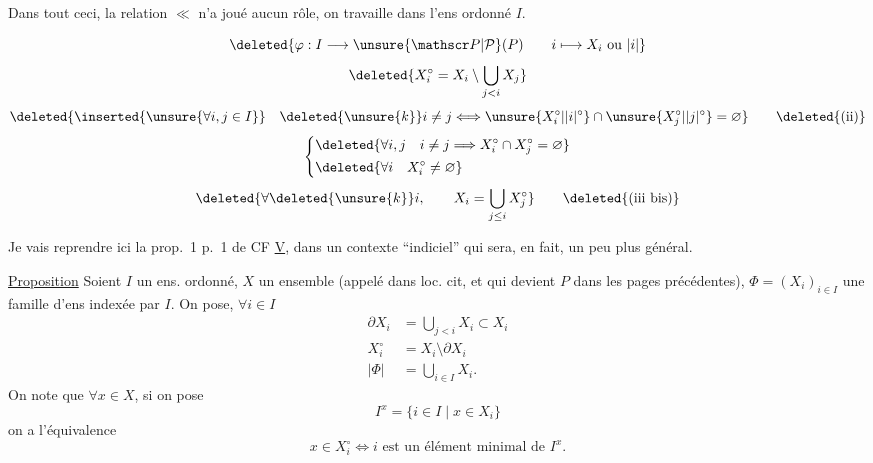 Dans tout ceci, la relation $\ll$ n'a joué aucun rôle, on travaille dans l'ens ordonné $I$.

\[
\deleted{\varphi:I\longrightarrow\unsure{\mathscr P|\mathcal P}(P)\qquad i\longmapsto X_i\text{ ou }|i|}
\]
\[
\deleted{X_i^{\circ}=X_i\setminus\bigcup_{j<i}X_j}
\]
\[
\deleted{\inserted{\unsure{\forall i,j\in I}}\quad \deleted{\unsure{k}}i\ne j\Longleftrightarrow
\unsure{X_i^{\circ}|\lvert i\rvert^{\circ}}\cap\unsure{X_j^{\circ}|\lvert j\rvert^{\circ}}=\varnothing}\tag*{\deleted{(ii)}}
\]
\[
\left\{\begin{aligned}
&\deleted{\forall i,j\quad i\ne j\Longrightarrow X_i^{\circ}\cap X_j^{\circ}=\varnothing}\\
&\deleted{\forall i\quad X_i^{\circ}\ne\varnothing}
\end{aligned}\right.
\]
\[
\deleted{\forall\deleted{\unsure{k}}i,\qquad X_i=\bigcup_{j\leq i}X_j^{\circ}}\tag*{\deleted{(iii bis)}}
\]

Je vais reprendre ici la prop.~1 p.~1 de CF \uline{V}, dans un contexte ``indiciel'' qui sera, en fait, un peu plus général.

\uline{Proposition} Soient $I$ un ens. ordonné,  $X$ un ensemble (appelé  dans loc. cit, et qui devient $P$ dans les pages précédentes), $\Phi=(X_i)_{i\in I}$ une famille d'ens indexée par $I$. 
\margin{[Je ne suis pas sûr si je l'utilise vraiment, si on ne le \unsure{suppose} pas, pour définir $X_i^{\circ}$ \unsure{(?)} il faut prendre $X_i\setminus X_i\cap\partial X_i$ (car on ne sait pas si $\partial X_i\subset X_i$)}
On pose, $\forall i\in I$
\[
\begin{aligned}
\partial X_i&=\bigcup_{j<i}X_i\subset X_i\\
X_i^{\circ}&=X_i\setminus\partial X_i\\
|\Phi|&=\bigcup_{i\in I}X_i.
\end{aligned}
\]
On note que $\forall x\in X$,  si on pose
\[
I^x=\{i\in I\mid x\in X_i\}
\]
on a l'équivalence
\[
x\in X_i^{\circ}\Longleftrightarrow i\text{ est un élément minimal de }I^x.
\]

